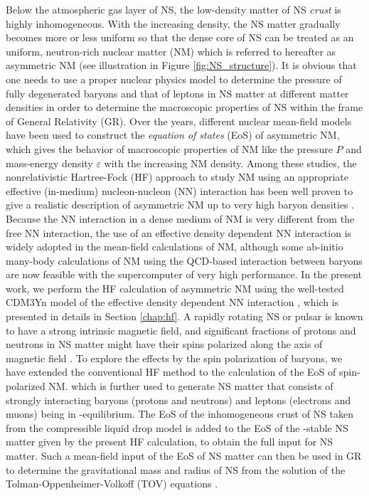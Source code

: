 Below the atmospheric gas layer of \gls{NS}, the low-density matter of NS \emph{crust}
is highly inhomogeneous. With the increasing density, the NS matter gradually becomes more 
or less uniform so that the dense core of NS can be treated as an uniform, neutron-rich
nuclear matter (NM) which is referred to hereafter as asymmetric NM (see illustration in  
Figure \ref{fig:NS_structure}). It is obvious that one needs to use a proper nuclear physics
model to determine the pressure of fully degenerated baryons and that of leptons in NS matter 
at different matter densities in order to determine the macroscopic properties of NS 
within the frame of General Relativity (GR). Over the years, different nuclear mean-field 
models have been used to construct the \emph{equation of states} (\gls{EoS}) of asymmetric NM, 
which gives the behavior of macroscopic properties of NM like the pressure $P$ and mass-energy 
density $\varepsilon$ with the increasing NM density. Among these studies, the nonrelativistic
Hartree-Fock (\gls{HF}) approach to study NM using an appropriate effective (in-medium) 
nucleon-nucleon (NN) interaction has been well proven to give a realistic description 
of asymmetric NM up to very high baryon densities \citep{khoa1996study}. Because the NN 
interaction in a dense medium of NM is very different from the free NN interaction, the use 
of an effective density dependent NN interaction is widely adopted in the mean-field 
calculations of NM, although
some ab-initio many-body calculations of NM using the QCD-based interaction between baryons
are now feasible with the supercomputer of very high performance. In the present work, we
perform the HF calculation of asymmetric NM using the well-tested CDM3Yn model of the effective
density dependent NN interaction \citep{tan2021equation}, which is presented in details
in Section \ref{chap:hf}. A rapidly rotating NS or pulsar is known to have a strong intrinsic
magnetic field, and significant fractions of protons and neutrons in NS matter might  
have their spins polarized along the axis of magnetic field \cite{broderick2000equation}. To explore the effects
by the spin polarization of baryons, we have extended the conventional HF method to the calculation
of the EoS of spin-polarized NM. which is further used to generate NS matter that consists 
of strongly interacting baryons (protons and neutrons) and leptons (electrons and muons) 
being in \textbeta-equilibrium. The EoS of the inhomogeneous crust of NS taken from the 
compressible liquid drop model \citep{douchin2000nuclear,douchin2001unified} is added to the \gls{EoS} of the \textbeta-stable 
NS matter given by the present \gls{HF} calculation, to obtain the full input
for NS matter. Such a mean-field input of the EoS of NS matter can then be used in GR 
to determine the gravitational mass and radius of NS \citep{tan2020spin,tan2021equation} 
from the solution of the Tolman-Oppenheimer-Volkoff (\gls{TOV}) equations \citep{oppenheimer1939massive}. 

